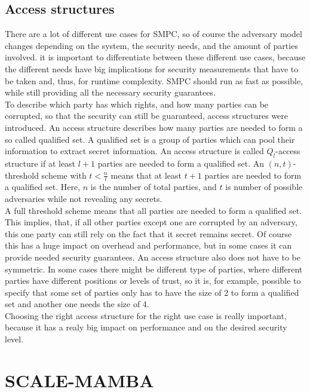 \documentclass[english,runningheads,a4paper]{llncs}[2018/03/10]
\begin{document}
\subsection{Access structures}
There are a lot of different use cases for SMPC, so of course the adversary model changes depending on the system, the security needs, and the amount of parties involved. it is important to differentiate between these different use cases, because the different needs have big implications for security measurements that have to be taken and, thus, for runtime complexity. SMPC should run as fast as possible, while still providing all the necessary security guarantees.\\
To describe which party has which rights, and how many parties can be corrupted, so that the security can still be guaranteed, access structures were introduced.
An access structure describes how many parties are needed to form a so called qualified set. A qualified set is a group of parties which can pool their information to extract secret information. An access structure is called \(Q_l \)-access structure if at least \(l+1\) parties are needed to  form a qualified set. 
An \((n,t)\)-threshold scheme with \(t<\frac{n}{l}\) means that at least \(t+1\) parties are needed to form a qualified set. Here, \(n\) is the number of total parties, and \(t\) is number of possible adversaries while not revealing any secrets.\\
A full threshold scheme means that all parties are needed to form a qualified set. This implies, that, if all other parties except one are corrupted by an adversary, this one party can still rely on the fact that it secret remains secret. Of course this has a huge impact on overhead and performance, but in some cases it can provide needed security guarantees.
An access structure also does not have to be symmetric. In some cases there might be different type of parties, where different parties have different positions or levels of trust, so it is, for example, possible to specify that some set of parties only has to have the size of 2 to form a qualified set and another one needs the size of 4.\\
Choosing the right access structure for the right use case is really important, because it has a realy big impact on performance and on the desired security level.


\section{SCALE-MAMBA}\label{sec:scalemamba}
\end{document}
